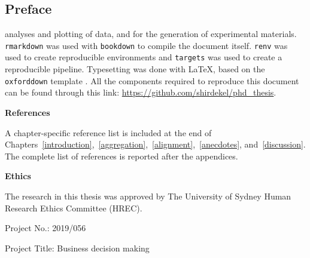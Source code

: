 \documentclass[a4paper, nobind]{templates/ociamthesis}
\newenvironment{preface}%
{   \begin{alwayssingle}\chapter*{Preface}
    \thispagestyle{empty}
    \pagestyle{empty}
    \setlength{\baselineskip}{\frontmatterbaselineskip}
  }
  {\end{alwayssingle}}
\theoremstyle{definition}
\theoremstyle{definition}
\theoremstyle{definition}
\theoremstyle{definition}
\theoremstyle{remark}
\begin{document}
\begin{romanpages}
\begin{preface}
  analyses and plotting of data, and for the generation of experimental materials.
  \texttt{rmarkdown} \autocite{xie2018} was used with \texttt{bookdown} \autocite{xie2016} to compile the
  document itself. \texttt{renv} \autocite{ushey2021} was used to create reproducible
  environments and \texttt{targets} \autocite{landau2021} was used to create a reproducible
  pipeline. Typesetting was done with \LaTeX, based on the \texttt{oxforddown} template
  \autocite{lyngs2019}. All the components required to reproduce this document can be
  found through this link: \url{https://github.com/shirdekel/phd_thesis}.

  \hfill\break

  \noindent \textbf{References}

  A chapter-specific reference list is included at the end of
  Chapters~\ref{introduction},~\ref{aggregation},~\ref{alignment},~\ref{anecdotes},
  and~\ref{discussion}. The complete list of references is reported after the
  appendices.

  \hfill\break

  \noindent \textbf{Ethics}

  The research in this thesis was approved by The University of Sydney Human
  Research Ethics Committee (HREC).

  Project No.: 2019/056

  Project Title: Business decision making
\end{preface}


\end{romanpages}
\end{document}
